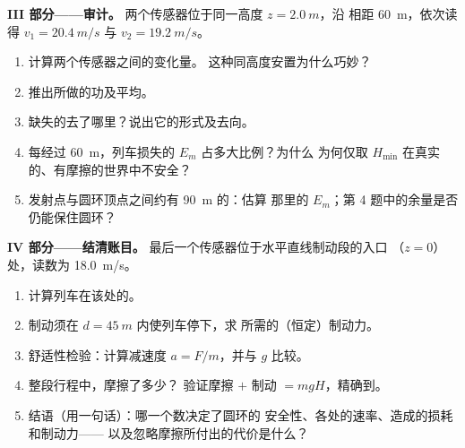\begin{problem}
\medskip
\noindent\textbf{III 部分——审计。}
两个传感器位于同一高度 $z = \qty{2.0}{m}$，沿
相距 \qty{60}{m}，依次读得 $v_1 = \qty{20.4}{m/s}$ 与 $v_2 = \qty{19.2}{m/s}$。
\begin{enumerate}[resume]
  \item 计算两个传感器之间的变化量。
        这种同高度安置为什么巧妙？
  \item 推出所做的功及平均。
  \item 缺失的去了哪里？说出它的形式及去向。
  \item 每经过 \qty{60}{m}，列车损失的 $E_m$ 占多大比例？为什么
        为何仅取 $H_{\min}$ 在真实的、有摩擦的世界中不安全？
  \item 发射点与圆环顶点之间约有 \qty{90}{m} 的：估算
        那里的 $E_m$；第 4 题中的余量是否仍能保住圆环？
\end{enumerate}

\medskip
\noindent\textbf{IV 部分——结清账目。}
最后一个传感器位于水平直线制动段的入口
（$z = 0$）处，读数为 \qty{18.0}{m/s}。
\begin{enumerate}[resume]
  \item 计算列车在该处的。
  \item 制动须在 $d = \qty{45}{m}$ 内使列车停下，求
        所需的（恒定）制动力。
  \item 舒适性检验：计算减速度 $a = F/m$，并与 $g$ 比较。
  \item 整段行程中，摩擦了多少？
        验证摩擦 $+$ 制动 $= mgH$，精确到。
  \item 结语（用一句话）：哪一个数决定了圆环的
        安全性、各处的速率、造成的损耗和制动力——
        以及忽略摩擦所付出的代价是什么？
\end{enumerate}
\end{problem}
